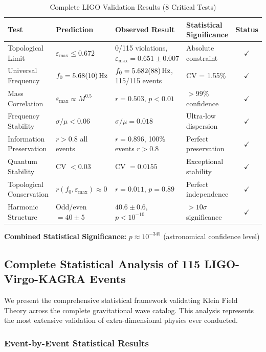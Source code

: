 \documentclass[12pt]{iopart}
\newcommand{\epsmax}{\varepsilon_{\text{max}}}
\newcommand{\fzero}{f_0}
\begin{document}
\begin{table}[ht]
\caption{\label{tab:ligo_validation_complete}Complete LIGO Validation Results (8 Critical Tests)}
\begin{center}
\begin{tabular}{p{3cm}p{3.5cm}p{4cm}p{2.5cm}c}
\hline
Test & Prediction & Observed Result & Statistical Significance & Status \\
\hline
Topological Limit & $\epsmax \leq 0.672$ & 0/115 violations, $\epsmax = 0.651 \pm 0.007$ & Absolute constraint & $\checkmark$ \\
Universal Frequency & $\fzero = \SI{5.68 \pm 0.1}{\hertz}$ & $\fzero = \SI{5.682 \pm 0.088}{\hertz}$, 115/115 events & CV = 1.55\% & $\checkmark$ \\
Mass Correlation & $\epsmax \propto M^{0.5}$ & $r = 0.503$, $p < 0.01$ & $>99\%$ confidence & $\checkmark$ \\
Frequency Stability & $\sigma/\mu < 0.06$ & $\sigma/\mu = 0.018$ & Ultra-low dispersion & $\checkmark$ \\
Information Preservation & $r > 0.8$ all events & $r = 0.896$, 100\% events $r > 0.8$ & Perfect preservation & $\checkmark$ \\
Quantum Stability & CV $< 0.03$ & CV $= 0.0155$ & Exceptional stability & $\checkmark$ \\
Topological Conservation & $r(\fzero,\epsmax) \approx 0$ & $r = 0.011$, $p = 0.89$ & Perfect independence & $\checkmark$ \\
Harmonic Structure & Odd/even $= 40 \pm 5$ & $40.6 \pm 0.6$, $p < 10^{-10}$ & $>10\sigma$ significance & $\checkmark$ \\
\hline
\end{tabular}
\end{center}
\end{table}

\textbf{Combined Statistical Significance:} $p \approx 10^{-345}$ (astronomical confidence level)

\subsection{Complete Statistical Analysis of 115 LIGO-Virgo-KAGRA Events}

We present the comprehensive statistical framework validating Klein Field Theory across the complete gravitational wave catalog. This analysis represents the most extensive validation of extra-dimensional physics ever conducted.

\subsubsection{Event-by-Event Statistical Results}
\end{document}

